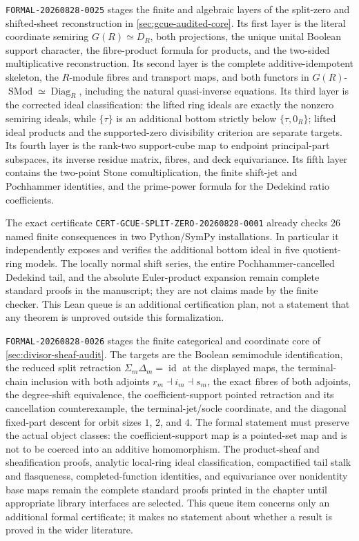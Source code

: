 \texttt{FORMAL-20260828-0025} stages the finite and algebraic layers of the split-zero and
shifted-sheet reconstruction in \cref{sec:gcue-audited-core}.  Its first layer is the literal
coordinate semiring $G(R)\simeq D_R$, both projections, the unique unital Boolean support
character, the fibre-product formula for products, and the two-sided multiplicative
reconstruction.  Its second layer is the complete additive-idempotent skeleton, the
$R$-module fibres and transport maps, and both functors in
$G(R)$-$\operatorname{SMod}\simeq\operatorname{Diag}_R$, including the natural
quasi-inverse equations.  Its third layer is the corrected ideal classification: the lifted
ring ideals are exactly the nonzero semiring ideals, while $\{\tau\}$ is an additional bottom
strictly below $\{\tau,0_R\}$; lifted ideal products and the supported-zero divisibility
criterion are separate targets.  Its fourth layer is the rank-two support-cube map to endpoint
principal-part subspaces, its inverse residue matrix, fibres, and deck equivariance.  Its fifth
layer contains the two-point Stone comultiplication, the finite shift-jet and Pochhammer
identities, and the prime-power formula for the Dedekind ratio coefficients.

The exact certificate \texttt{CERT-GCUE-SPLIT-ZERO-20260828-0001} already checks 26 named
finite consequences in two Python/SymPy installations.  In particular it independently
exposes and verifies the additional bottom ideal in five quotient-ring models.  The locally
normal shift series, the entire Pochhammer-cancelled Dedekind tail, and the absolute
Euler-product expansion remain complete standard proofs in the manuscript; they are not
claims made by the finite checker.  This Lean queue is an additional certification plan, not
a statement that any theorem is unproved outside this formalization.

\texttt{FORMAL-20260828-0026} stages the finite categorical and coordinate core of
\cref{sec:divisor-sheaf-audit}.  The targets are the Boolean semimodule identification,
the reduced split retraction $\Sigma_m\Delta_m=\operatorname{id}$ at the displayed maps, the terminal-chain
inclusion with both adjoints $r_m\dashv i_m\dashv s_m$, the exact fibres of both adjoints,
the degree-shift equivalence, the coefficient-support pointed retraction and its cancellation
counterexample, the terminal-jet/socle coordinate, and the diagonal fixed-part descent for
orbit sizes $1$, $2$, and $4$.  The formal statement must preserve the actual object classes:
the coefficient-support map is a pointed-set map and is not to be coerced into an additive
homomorphism.  The product-sheaf and sheafification proofs, analytic local-ring ideal
classification, compactified tail stalk and flasqueness, completed-function identities, and
equivariance over nonidentity base maps remain the complete standard proofs printed in the
chapter until appropriate library interfaces are selected.  This queue item concerns only
an additional formal certificate; it makes no statement about whether a result is proved in
the wider literature.

